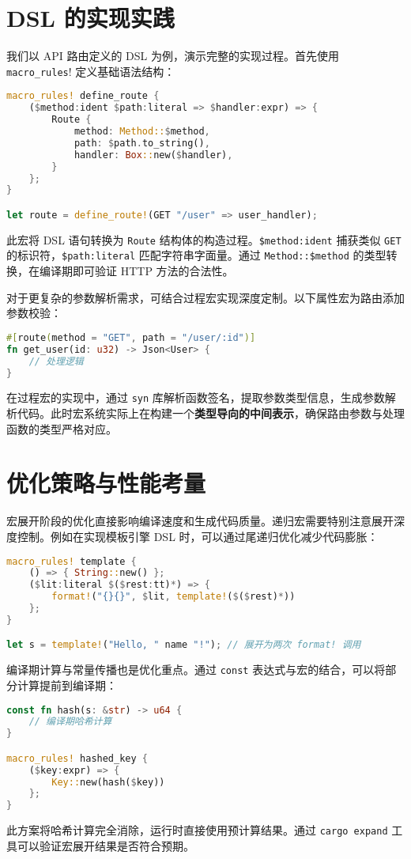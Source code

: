 \chapter{DSL 的实现实践}
我们以 API 路由定义的 DSL 为例，演示完整的实现过程。首先使用 \verb!macro_rules!! 定义基础语法结构：\par
\begin{lstlisting}[language=rust]
macro_rules! define_route {
    ($method:ident $path:literal => $handler:expr) => {
        Route {
            method: Method::$method,
            path: $path.to_string(),
            handler: Box::new($handler),
        }
    };
}

let route = define_route!(GET "/user" => user_handler);
\end{lstlisting}
此宏将 DSL 语句转换为 \verb!Route! 结构体的构造过程。\verb!$method:ident! 捕获类似 \verb!GET! 的标识符，\verb!$path:literal! 匹配字符串字面量。通过 \verb!Method::$method! 的类型转换，在编译期即可验证 HTTP 方法的合法性。\par
对于更复杂的参数解析需求，可结合过程宏实现深度定制。以下属性宏为路由添加参数校验：\par
\begin{lstlisting}[language=rust]
#[route(method = "GET", path = "/user/:id")]
fn get_user(id: u32) -> Json<User> {
    // 处理逻辑
}
\end{lstlisting}
在过程宏的实现中，通过 \verb!syn! 库解析函数签名，提取参数类型信息，生成参数解析代码。此时宏系统实际上在构建一个\textbf{类型导向的中间表示}，确保路由参数与处理函数的类型严格对应。\par
\chapter{优化策略与性能考量}
宏展开阶段的优化直接影响编译速度和生成代码质量。递归宏需要特别注意展开深度控制。例如在实现模板引擎 DSL 时，可以通过尾递归优化减少代码膨胀：\par
\begin{lstlisting}[language=rust]
macro_rules! template {
    () => { String::new() };
    ($lit:literal $($rest:tt)*) => {
        format!("{}{}", $lit, template!($($rest)*))
    };
}

let s = template!("Hello, " name "!"); // 展开为两次 format! 调用
\end{lstlisting}
编译期计算与常量传播也是优化重点。通过 \verb!const! 表达式与宏的结合，可以将部分计算提前到编译期：\par
\begin{lstlisting}[language=rust]
const fn hash(s: &str) -> u64 {
    // 编译期哈希计算
}

macro_rules! hashed_key {
    ($key:expr) => {
        Key::new(hash($key))
    };
}
\end{lstlisting}
此方案将哈希计算完全消除，运行时直接使用预计算结果。通过 \verb!cargo expand! 工具可以验证宏展开结果是否符合预期。\par
